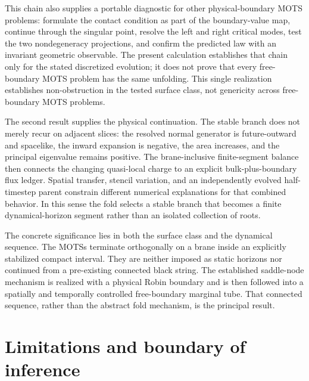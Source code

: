 \documentclass[11pt]{article}
\begin{document}
This chain also supplies a portable diagnostic for other physical-boundary
MOTS problems: formulate the contact condition as part of the boundary-value
map, continue through the singular point, resolve the left and right critical
modes, test the two nondegeneracy projections, and confirm the predicted law
with an invariant geometric observable.  The present calculation establishes
that chain only for the stated discretized evolution; it does not prove that
every free-boundary MOTS problem has the same unfolding.  This single
realization establishes non-obstruction in the tested surface class, not
genericity across free-boundary MOTS problems.

The second result supplies the physical continuation.  The stable branch does
not merely recur on adjacent slices: the resolved normal generator is
future-outward and spacelike, the inward expansion is negative, the area
increases, and the principal eigenvalue remains positive.  The
brane-inclusive finite-segment balance then connects the changing quasi-local
charge to an explicit bulk-plus-boundary flux ledger.  Spatial transfer,
stencil variation, and an independently evolved half-timestep parent constrain
different numerical explanations for that combined behavior.  In this sense
the fold selects a stable branch that becomes a finite dynamical-horizon
segment rather than an isolated collection of roots.

The concrete significance lies in both the surface class and the dynamical
sequence.  The MOTSs terminate orthogonally on a brane inside an explicitly
stabilized compact interval.  They are neither imposed as static horizons nor
continued from a pre-existing connected black string.  The established
saddle-node mechanism is realized with a physical Robin boundary and is then
followed into a spatially and temporally controlled free-boundary marginal
tube.  That connected sequence, rather than the abstract fold mechanism, is
the principal result.

\section{Limitations and boundary of inference}
\end{document}
